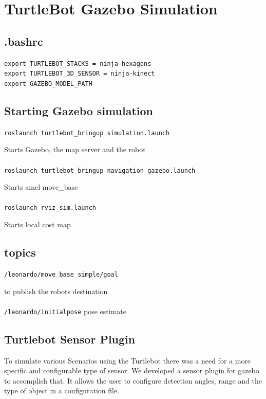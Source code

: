 \chapter{TurtleBot Gazebo Simulation}
\label{chap:TurtleBotGazeboSimulation}

	
\section{.bashrc}
	\texttt{export TURTLEBOT\_STACKS = ninja-hexagons}
	\\
	\texttt{export TURTLEBOT\_3D\_SENSOR = ninja-kinect}
	\\
	\texttt{export GAZEBO\_MODEL\_PATH}


\section{Starting Gazebo simulation}

\texttt{roslaunch turtlebot\_bringup simulation.launch}
	
	Starts Gazebo, the map server and the robot	
	\\	
	\\	
		
\texttt{roslaunch turtlebot\_bringup navigation\_gazebo.launch}
	
	Starts amcl move\_base
	\\
	\\
	
\texttt{roslaunch rviz\_sim.launch}
	
	Starts local cost map

\section{topics}

\texttt{/leonardo/move\_base\_simple/goal}

	to publish the robots destination
\\
\\
\texttt{/leonardo/initialpose}
	pose estimate	


\section{Turtlebot Sensor Plugin}

To simulate various Scenarios using the Turtlebot there was a need
for a more specific and configurable type of sensor.
We developed a sensor plugin for gazebo to accomplish that.
It allows the user to configure detection angles, range and the type
of object in a configuration file.

